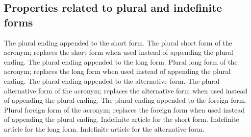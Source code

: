 \documentclass{acro-manual}
\begin{document}
\subsection{Properties related to plural and indefinite forms}\label{sec:prop-relat-plur}
\begin{properties}
    The plural ending appended to the short form.
  \Initial
    The plural short form of the acronym; replaces the short form when used
    instead of appending the plural ending.
    The plural ending appended to the long form.
  \Initial
    Plural long form of the acronym; replaces the long form when used
    instead of appending the plural ending.
    The plural ending appended to the alternative form.
  \Initial
    The plural alternative form of the acronym; replaces the alternative form
    when used instead of appending the plural ending.
    The plural ending appended to the foreign form.
  \Initial
    Plural foreign form of the acronym; replaces the foreign form when used
    instead of appending the plural ending.
    Indefinite article for the short form.
    Indefinite article for the long form.
    Indefinite article for the alternative form.
\end{properties}
\end{document}
